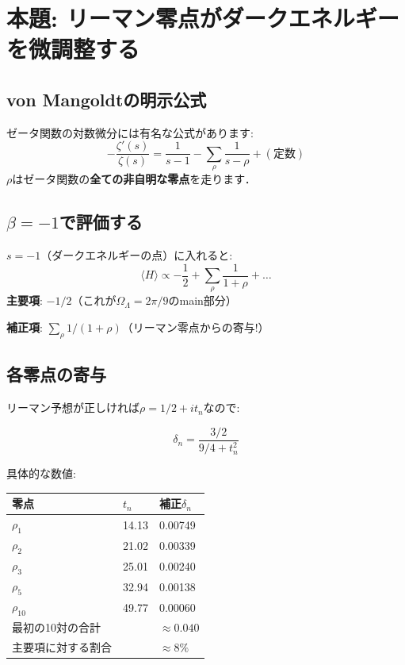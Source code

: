 \documentclass[11pt,a4paper]{article}
\begin{document}
\section{本題: リーマン零点がダークエネルギーを微調整する}
\subsection{von Mangoldtの明示公式}
ゼータ関数の対数微分には有名な公式があります:
$$-\frac{\zeta'(s)}{\zeta(s)} = \frac{1}{s-1} - \sum_{\rho}\frac{1}{s-\rho} + (\text{定数})$$
$\rho$はゼータ関数の\textbf{全ての非自明な零点}を走ります．
\subsection{$\beta = -1$で評価する}
$s = -1$（ダークエネルギーの点）に入れると:
$$\langle H\rangle \propto -\frac{1}{2} + \sum_\rho\frac{1}{1+\rho} + \ldots$$
\textbf{主要項}: $-1/2$（これが$\Omega_\Lambda = 2\pi/9$のmain部分）

\textbf{補正項}: $\sum_\rho 1/(1+\rho)$（リーマン零点からの寄与!）
\subsection{各零点の寄与}
リーマン予想が正しければ$\rho = 1/2 + it_n$なので:
\begin{tcolorbox}[colback=green!5,colframe=green!60!black,title=各零点の補正公式]
$$\delta_n = \frac{3/2}{9/4 + t_n^2}$$
\end{tcolorbox}
具体的な数値:
\begin{center}
\begin{tabular}{lll}
\toprule 零点 & $t_n$ & 補正$\delta_n$ \\ \midrule
$\rho_1$ & 14.13 & 0.00749 \\
$\rho_2$ & 21.02 & 0.00339 \\
$\rho_3$ & 25.01 & 0.00240 \\
$\rho_5$ & 32.94 & 0.00138 \\
$\rho_{10}$ & 49.77 & 0.00060 \\
\midrule 最初の10対の合計 & & $\approx 0.040$ \\
主要項に対する割合 & & $\approx 8\%$ \\
\bottomrule
\end{tabular}
\end{center}
\end{document}
